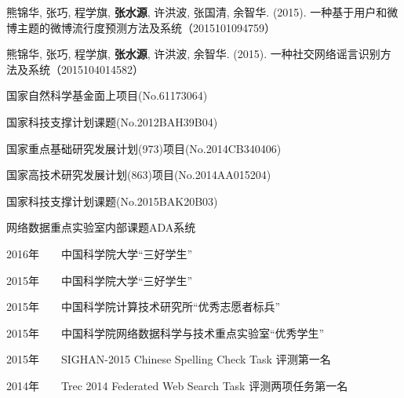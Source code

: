 \begin{resume}
\begin{enumerate}[{[}1{]}]
 \item 熊锦华, 张巧, 程学旗, \textbf{张水源}, 许洪波, 张国清, 余智华. (2015). 一种基于用户和微博主题的微博流行度预测方法及系统（2015101094759）
 \item 熊锦华, 张巧, 程学旗, \textbf{张水源}, 许洪波, 余智华. (2015). 一种社交网络谣言识别方法及系统（2015104014582）

\end{enumerate}


\clearpage

\begin{enumerate}[{[}1{]}]
\item 国家自然科学基金面上项目(No.61173064)
\item 国家科技支撑计划课题(No.2012BAH39B04)
\item 国家重点基础研究发展计划(973)项目(No.2014CB340406)
\item 国家高技术研究发展计划(863)项目(No.2014AA015204)
\item 国家科技支撑计划课题(No.2015BAK20B03)
\item 网络数据重点实验室内部课题ADA系统
\end{enumerate}


  \begin{enumerate}[{[}1{]}]
  \item  2016年~~~~中国科学院大学``三好学生''
  \item  2015年~~~~中国科学院大学``三好学生''
  \item   2015年~~~~中国科学院计算技术研究所``优秀志愿者标兵''
  \item   2015年~~~~中国科学院网络数据科学与技术重点实验室``优秀学生''
  \item   2015年~~~~SIGHAN-2015 Chinese Spelling Check Task 评测第一名
  \item   2014年~~~~Trec 2014 Federated Web Search Task 评测两项任务第一名
  \end{enumerate}
\end{resume}
